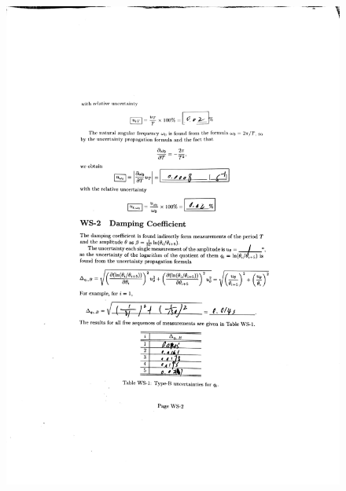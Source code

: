 \documentclass[a4paper]{report}
\begin{document}
	\begin{figure}[H]
		\centering
		\includegraphics[width=1\linewidth]{7.jpg}
	\end{figure}
\end{document}
